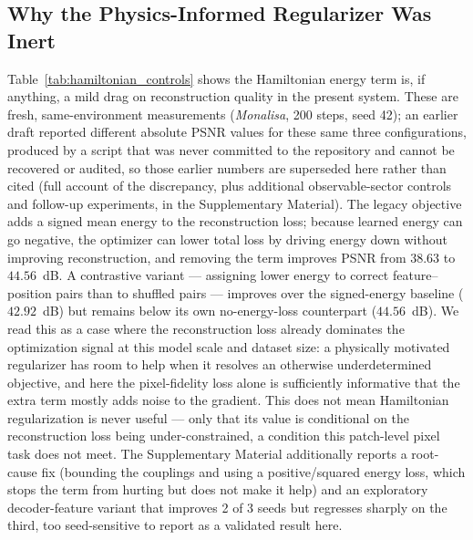 \documentclass[journal]{IEEEtran}
\begin{document}
\subsection{Why the Physics-Informed Regularizer Was Inert}
\label{sec:regularizer_inert}
Table~\ref{tab:hamiltonian_controls} shows the Hamiltonian energy term is, if anything, a mild drag on reconstruction quality in the present system. These are fresh, same-environment measurements (\textit{Monalisa}, 200 steps, seed 42); an earlier draft reported different absolute PSNR values for these same three configurations, produced by a script that was never committed to the repository and cannot be recovered or audited, so those earlier numbers are superseded here rather than cited (full account of the discrepancy, plus additional observable-sector controls and follow-up experiments, in the Supplementary Material). The legacy objective adds a signed mean energy to the reconstruction loss; because learned energy can go negative, the optimizer can lower total loss by driving energy down without improving reconstruction, and removing the term improves PSNR from $38.63$ to $44.56$~dB. A contrastive variant --- assigning lower energy to correct feature--position pairs than to shuffled pairs --- improves over the signed-energy baseline ($42.92$~dB) but remains below its own no-energy-loss counterpart ($44.56$~dB). We read this as a case where the reconstruction loss already dominates the optimization signal at this model scale and dataset size: a physically motivated regularizer has room to help when it resolves an otherwise underdetermined objective, and here the pixel-fidelity loss alone is sufficiently informative that the extra term mostly adds noise to the gradient. This does not mean Hamiltonian regularization is never useful --- only that its value is conditional on the reconstruction loss being under-constrained, a condition this patch-level pixel task does not meet. The Supplementary Material additionally reports a root-cause fix (bounding the couplings and using a positive/squared energy loss, which stops the term from hurting but does not make it help) and an exploratory decoder-feature variant that improves 2 of 3 seeds but regresses sharply on the third, too seed-sensitive to report as a validated result here.
\end{document}
